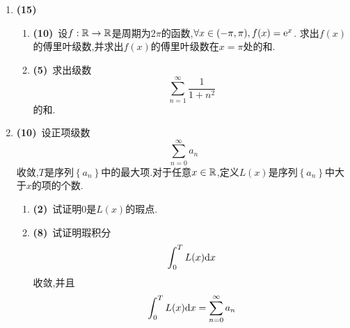 \documentclass{ctexart}
\begin{document}
\begin{enumerate}[leftmargin=*,label=\textbf{\arabic*.},topsep=0pt,parsep=0pt,itemsep=0pt,partopsep=0pt]
    \item \textbf{(15)}
        \begin{enumerate}[label=\tbf{(\arabic*)},topsep=0pt,parsep=0pt,itemsep=0pt,partopsep=0pt]
            \item \textbf{(10)}\ 设$f:\mathbb{R}\to\mathbb{R}$是周期为$2\pi$的函数,$\forall x\in(-\pi,\pi),f(x)=\mathrm{e}^x$.%
                求出$f(x)$的傅里叶级数,并求出$f(x)$的傅里叶级数在$x=\pi$处的和.
            \item \textbf{(5)}\ 求出级数
                \[\sum_{n=1}^{\infty}\dfrac{1}{1+n^2}\]
                的和.
        \end{enumerate}

    \item \textbf{(10)}\ 设正项级数
        \[\sum_{n=0}^{\infty}a_n\]
        收敛,$T$是序列$\left\{a_n\right\}$中的最大项.对于任意$x\in\mathbb{R}$,定义$L(x)$是序列$\left\{a_n\right\}$中大于$x$的项的个数.
        \begin{enumerate}[label=\tbf{(\arabic*)},topsep=0pt,parsep=0pt,itemsep=0pt,partopsep=0pt]
            \item \textbf{(2)}\ 试证明$0$是$L(x)$的瑕点.
            \item \textbf{(8)}\ 试证明瑕积分
                \[\int_0^TL(x)\mathrm{d} x\]
                收敛,并且
                \[\int_0^TL(x)\mathrm{d} x=\sum_{n=0}^{\infty}a_n\]
        \end{enumerate}
    
\end{enumerate}
\end{document}

